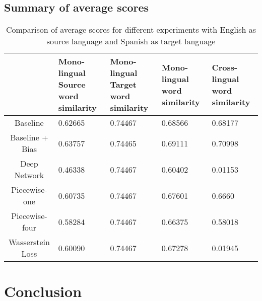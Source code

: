 \documentclass[11pt]{article}
\begin{document}
\subsection{Summary of average scores}
\begin{table*}[ht]
  \begin{center}
  \begin{tabular}{|c|l|l|l|l|}
  \hline
   & \multicolumn{1}{|p{1cm}|}{Mono-lingual Source word similarity}& \multicolumn{1}{|p{1cm}|}{Mono-lingual Target word similarity} & \multicolumn{1}{|p{1cm}|}{Mono-lingual word similarity} & \multicolumn{1}{|p{1cm}|}{Cross-lingual word similarity} \\
  \hline
  Baseline & 0.62665 & 0.74467 & 0.68566 & 0.68177  \\
  \hline
  Baseline + Bias & 0.63757 & 0.74465 & 0.69111 & 0.70998 \\
  \hline
  Deep Network & 0.46338 & 0.74467 & 0.60402 & 0.01153 \\
  \hline
  Piecewise-one & 0.60735 & 0.74467 & 0.67601 & 0.6660 \\
  \hline
  Piecewise-four & 0.58284 & 0.74467 & 0.66375 & 0.58018 \\
  \hline
  Wasserstein Loss & 0.60090 & 0.74467 & 0.67278 & 0.01945 \\
  \hline
  \end{tabular}
  \end{center}
  \caption{ Comparison of average scores for different experiments with English as source language and Spanish as target language}
  \label{summary-table}
\end{table*}

\section{Conclusion}





\end{document}

